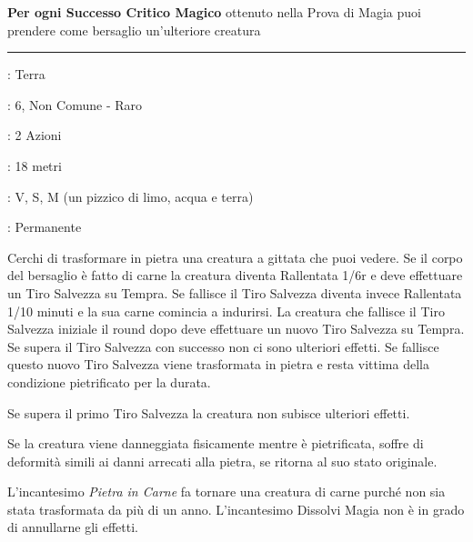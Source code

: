 \begin{multicols}{2}
\textbf{Per ogni Successo Critico Magico} ottenuto nella Prova di Magia puoi prendere come bersaglio un'ulteriore creatura

\smallskip\noindent\rule{\linewidth}{2pt} \hypertarget{Carne in Pietra - Pietra in Carne}{}\medskip{}\hypertarget{Pietra in Carne}{}\hypertarget{Carbe in Pietra}{}
\noindent
\begin{description}[noitemsep, topsep=0pt, parsep=0pt, partopsep=0pt, leftmargin=0cm, labelwidth=2.8cm]
	\item[\textbf{Lista di Magia}]: Terra
	\item[\textbf{Livello}]: 6, Non Comune - Raro
	\item[\textbf{T. di Lancio}]: 2 Azioni
	\item[\textbf{Gittata}]: 18 metri
	\item[\textbf{Componenti}]: V, S, M (un pizzico di limo, acqua e terra)
	\item[\textbf{Durata}]: Permanente
\end{description}

Cerchi di trasformare in pietra una creatura a gittata che puoi vedere. Se il corpo del bersaglio è fatto di carne la creatura diventa Rallentata 1/6r e deve effettuare un Tiro Salvezza su Tempra. Se fallisce il Tiro Salvezza diventa invece Rallentata 1/10 minuti e la sua carne comincia a indurirsi.
La creatura che fallisce il Tiro Salvezza iniziale il round dopo deve effettuare un nuovo Tiro Salvezza su Tempra. Se supera il Tiro Salvezza con successo non ci sono ulteriori effetti. Se fallisce questo nuovo Tiro Salvezza viene trasformata in pietra e resta vittima della condizione pietrificato per la durata.

Se supera il primo Tiro Salvezza la creatura non subisce ulteriori effetti.

Se la creatura viene danneggiata fisicamente mentre è pietrificata, soffre di deformità simili ai danni arrecati alla pietra, se ritorna al suo stato originale.

L'incantesimo \emph{Pietra in Carne} fa tornare una creatura di carne purché non sia stata trasformata da più di un anno. L'incantesimo Dissolvi Magia non è in grado di annullarne gli effetti.


\end{multicols}
